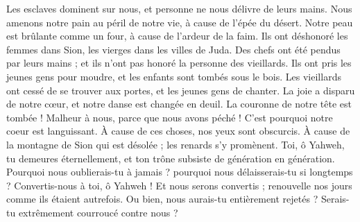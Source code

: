 \begin{multicols}{2}
Les esclaves dominent sur nous, et personne ne nous délivre de leurs mains.
Nous amenons notre pain au péril de notre vie, à cause de l'épée du désert.
Notre peau est brûlante comme un four, à cause de l'ardeur de la faim.
Ils ont déshonoré les femmes dans Sion, les vierges dans les villes de Juda.
Des chefs ont été pendus par leurs mains ; et ils n'ont pas honoré la personne des vieillards.
Ils ont pris les jeunes gens pour moudre, et les enfants sont tombés sous le bois.
Les vieillards ont cessé de se trouver aux portes, et les jeunes gens de chanter.
La joie a disparu de notre cœur, et notre danse est changée en deuil.
La couronne de notre tête est tombée ! Malheur à nous, parce que nous avons péché !
C'est pourquoi notre coeur est languissant. À cause de ces choses, nos yeux sont obscurcis.
À cause de la montagne de Sion qui est désolée ; les renards s'y promènent.
Toi, ô Yahweh, tu demeures éternellement, et ton trône subsiste de génération en génération.
Pourquoi nous oublierais-tu à jamais ? pourquoi nous délaisserais-tu si longtemps ?
Convertis-nous à toi, ô Yahweh ! Et nous serons convertis ; renouvelle nos jours comme ils étaient autrefois.
Ou bien, nous aurais-tu entièrement rejetés ? Serais-tu extrêmement courroucé contre nous ?
\PPE{}
\end{multicols}
